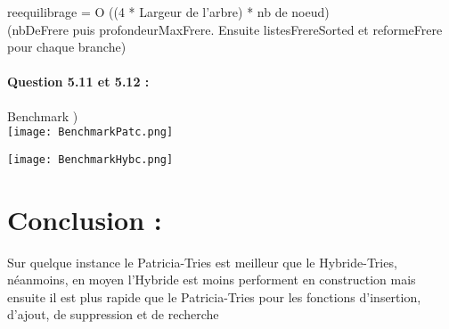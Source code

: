 \documentclass{article}
\begin{document}
reequilibrage = O ((4 * Largeur de l'arbre) * nb de noeud)\\
(nbDeFrere puis profondeurMaxFrere. Ensuite listesFrereSorted et reformeFrere pour chaque branche)\\


\newpage
\paragraph{Question 5.11 et 5.12 :}

Benchmark )\\

\texttt{[image: BenchmarkPatc.png]}

\texttt{[image: BenchmarkHybc.png]}

\newpage

\section{Conclusion :}

Sur quelque instance le Patricia-Tries est meilleur que le Hybride-Tries,
n\'eanmoins, en moyen l'Hybride est moins performent en construction mais ensuite
il est plus rapide que le Patricia-Tries pour les fonctions d'insertion,
d'ajout, de suppression et de recherche\\
\end{document}
